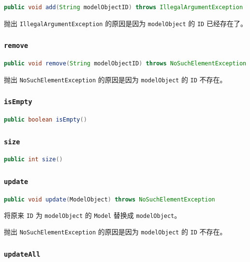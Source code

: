\documentclass[hyperref,UTF8,12pt,a4paper]{ctexart}
\begin{document}
\begin{lstlisting}[language=Java]
    public void add(String modelObjectID) throws IllegalArgumentException
\end{lstlisting}

抛出 \texttt{IllegalArgumentException} 的原因是因为 \texttt{modelObject} 的 \texttt{ID} 已经存在了。

\subsubsection{\texttt{remove}}

\begin{lstlisting}[language=Java]
	public void remove(String modelObjectID) throws NoSuchElementException
\end{lstlisting}

抛出 \texttt{NoSuchElementException} 的原因是因为 \texttt{modelObject} 的 \texttt{ID} 不存在。

\subsubsection{\texttt{isEmpty}}
\begin{lstlisting}[language=Java]
    public boolean isEmpty()
\end{lstlisting}

\subsubsection{\texttt{size}}

\begin{lstlisting}[language=Java]
	public int size()
\end{lstlisting}

\subsubsection{\texttt{update}}

\begin{lstlisting}[language=Java]
	public void update(ModelObject) throws NoSuchElementException
\end{lstlisting}

将原来 \texttt{ID} 为 \texttt{modelObject} 的 \texttt{Model} 替换成 \texttt{modelObject}。

抛出 \texttt{NoSuchElementException} 的原因是因为 \texttt{modelObject} 的 \texttt{ID} 不存在。

\subsubsection{\texttt{updateAll}}
\end{document}
